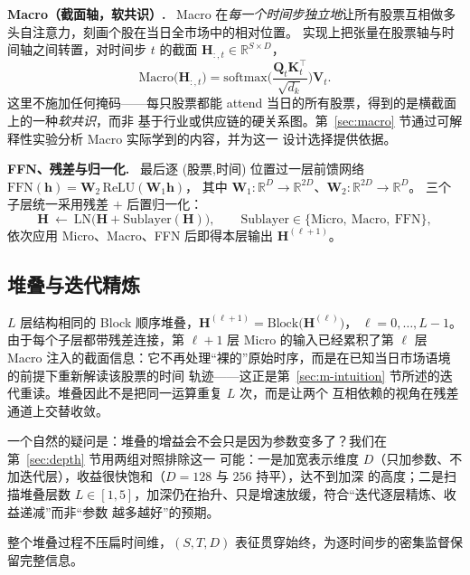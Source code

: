 \documentclass[a4paper,11pt,fontset=fandol]{ctexart}
\newcommand{\comp}[1]{\par\smallskip\noindent\textbf{\heiti #1.}\ }
\begin{document}
\comp{Macro（截面轴，软共识）}
Macro 在\emph{每一个时间步独立地}让所有股票互相做多头自注意力，刻画个股在当日全市场中的相对位置。
实现上把张量在股票轴与时间轴之间转置，对时间步 $t$ 的截面 $\bm{H}_{:,t}\in\mathbb{R}^{S\times D}$，
\begin{equation}\label{eq:macro}
\mathrm{Macro}\big(\bm{H}_{:,t}\big)=\mathrm{softmax}\!\Big(\frac{\bm{Q}_t\bm{K}_t^{\top}}{\sqrt{d_k}}\Big)\bm{V}_t.
\end{equation}
这里不施加任何掩码——每只股票都能 attend 当日的所有股票，得到的是横截面上的一种\emph{软共识}，而非
基于行业或供应链的硬关系图。第~\ref{sec:macro} 节通过可解释性实验分析 Macro 实际学到的内容，并为这一
设计选择提供依据。

\comp{FFN、残差与归一化}
最后逐 (股票,时间) 位置过一层前馈网络 $\mathrm{FFN}(\bm{h})=\bm{W}_2\,\mathrm{ReLU}(\bm{W}_1\bm{h})$，
其中 $\bm{W}_1:\mathbb{R}^{D}\!\to\!\mathbb{R}^{2D}$、$\bm{W}_2:\mathbb{R}^{2D}\!\to\!\mathbb{R}^{D}$。
三个子层统一采用残差 $+$ 后置归一化：
\begin{equation}\label{eq:residual}
\bm{H}\ \leftarrow\ \mathrm{LN}\big(\bm{H}+\mathrm{Sublayer}(\bm{H})\big),\qquad
\mathrm{Sublayer}\in\{\mathrm{Micro},\ \mathrm{Macro},\ \mathrm{FFN}\},
\end{equation}
依次应用 Micro、Macro、FFN 后即得本层输出 $\bm{H}^{(\ell+1)}$。

\subsection{堆叠与迭代精炼}\label{sec:m-stack}
$L$ 层结构相同的 Block 顺序堆叠，$\bm{H}^{(\ell+1)}=\mathrm{Block}\big(\bm{H}^{(\ell)}\big)$，
$\ell=0,\dots,L-1$。由于每个子层都带残差连接，第 $\ell{+}1$ 层 Micro 的输入已经累积了第 $\ell$ 层
Macro 注入的截面信息：它不再处理“裸的”原始时序，而是在已知当日市场语境的前提下重新解读该股票的时间
轨迹——这正是第~\ref{sec:m-intuition} 节所述的迭代重读。堆叠因此不是把同一运算重复 $L$ 次，而是让两个
互相依赖的视角在残差通道上交替收敛。

一个自然的疑问是：堆叠的增益会不会只是因为参数变多了？我们在第~\ref{sec:depth} 节用两组对照排除这一
可能：一是加宽表示维度 $D$（只加参数、不加迭代层），收益很快饱和（$D{=}128$ 与 $256$ 持平），达不到加深
的高度；二是扫描堆叠层数 $L\in[1,5]$，加深仍在抬升、只是增速放缓，符合“迭代逐层精炼、收益递减”而非“参数
越多越好”的预期。

整个堆叠过程不压扁时间维，$(S,T,D)$ 表征贯穿始终，为逐时间步的密集监督保留完整信息。
\end{document}
